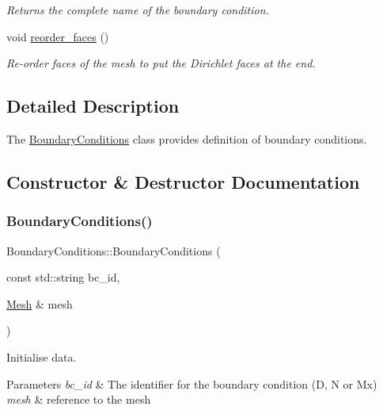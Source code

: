 \begin{DoxyCompactItemize}
\begin{DoxyCompactList}\small\item\em Returns the complete name of the boundary condition. \end{DoxyCompactList}\item 
\mbox{\label{classBoundaryConditions_a1898911b1e8e0b2832e2ce406b238d99}} 
void \hyperlink{classBoundaryConditions_a1898911b1e8e0b2832e2ce406b238d99}{reorder\+\_\+faces} ()
\begin{DoxyCompactList}\small\item\em Re-\/order faces of the mesh to put the Dirichlet faces at the end. \end{DoxyCompactList}\end{DoxyCompactItemize}


\subsection{Detailed Description}
The \hyperlink{classBoundaryConditions}{Boundary\+Conditions} class provides definition of boundary conditions. 

\subsection{Constructor \& Destructor Documentation}
\mbox{\label{classBoundaryConditions_a5f9b50ca35f0fcee51e84e015223396c}} 
\subsubsection{\texorpdfstring{Boundary\+Conditions()}{BoundaryConditions()}}
{\footnotesize\ttfamily Boundary\+Conditions\+::\+Boundary\+Conditions (\begin{DoxyParamCaption}\item[{const std\+::string}]{bc\+\_\+id,  }\item[{\hyperlink{classHArDCore3D_1_1Mesh}{Mesh} \&}]{mesh }\end{DoxyParamCaption})}



Initialise data. 


\begin{DoxyParams}{Parameters}
{\em bc\+\_\+id} & The identifier for the boundary condition (D, N or Mx) \\
\hline
{\em mesh} & reference to the mesh \\
\hline
\end{DoxyParams}


